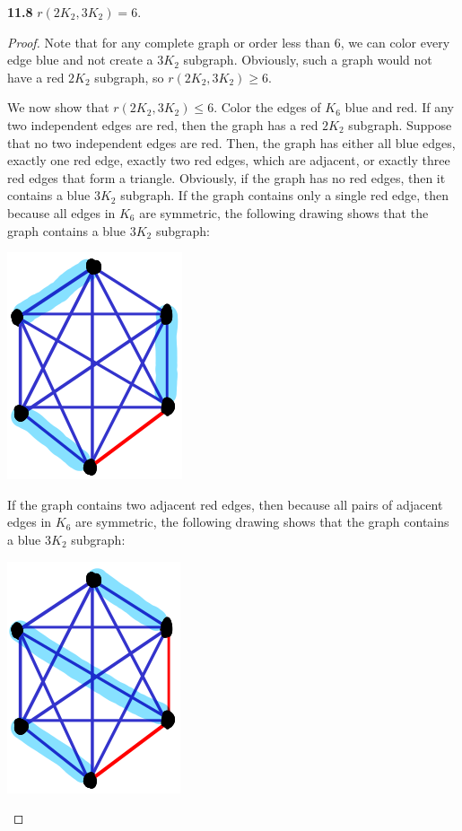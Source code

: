 \documentclass[12pt]{article}
\begin{document}
\newpage\noindent\textbf{11.8} $r(2K_2, 3K_2) = 6$.
\begin{proof}
    Note that for any complete graph or order less than 6, we can color every edge blue and not create a $3K_2$ subgraph.
    Obviously, such a graph would not have a red $2K_2$ subgraph, so $r(2K_2, 3K_2) \geq 6$.
    
    We now show that $r(2K_2, 3K_2) \leq 6$.
    Color the edges of $K_6$ blue and red.
    If any two independent edges are red, then the graph has a red $2K_2$ subgraph.
    Suppose that no two independent edges are red.
    Then, the graph has either all blue edges, exactly one red edge, exactly two red edges, which are adjacent, or exactly three red edges that form a triangle.
    Obviously, if the graph has no red edges, then it contains a blue $3K_2$ subgraph.
    If the graph contains only a single red edge, then because all edges in $K_6$ are symmetric, the following drawing shows that the graph contains a blue $3K_2$ subgraph:
    \begin{center} \includegraphics[scale=.5]{2.png} \end{center}
    If the graph contains two adjacent red edges, then because all pairs of adjacent edges in $K_6$ are symmetric, the following drawing shows that the graph contains a blue $3K_2$ subgraph:
    \begin{center} \includegraphics[scale=.5]{3.png} \end{center}

\end{proof}
\end{document}
